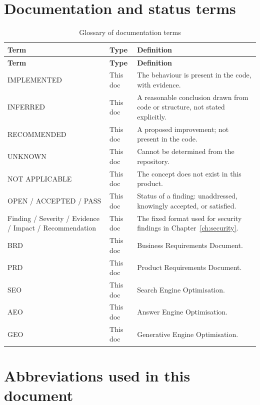 \section{Documentation and status terms}

\begin{longtable}{@{}L{3.8cm}L{1.6cm}L{8.8cm}@{}}
\caption{Glossary of documentation terms}\\
\toprule
\textbf{Term} & \textbf{Type} & \textbf{Definition} \\
\midrule
\endfirsthead
\toprule
\textbf{Term} & \textbf{Type} & \textbf{Definition} \\
\midrule
\endhead
IMPLEMENTED & This doc & The behaviour is present in the code, with evidence. \\
INFERRED & This doc & A reasonable conclusion drawn from code or structure, not
stated explicitly. \\
RECOMMENDED & This doc & A proposed improvement; not present in the code. \\
UNKNOWN & This doc & Cannot be determined from the repository. \\
NOT APPLICABLE & This doc & The concept does not exist in this product. \\
OPEN / ACCEPTED / PASS & This doc & Status of a finding: unaddressed, knowingly
accepted, or satisfied. \\
Finding / Severity / Evidence / Impact / Recommendation & This doc & The fixed
format used for security findings in Chapter~\ref{ch:security}. \\
BRD & This doc & Business Requirements Document. \\
PRD & This doc & Product Requirements Document. \\
SEO & This doc & Search Engine Optimisation. \\
AEO & This doc & Answer Engine Optimisation. \\
GEO & This doc & Generative Engine Optimisation. \\
\bottomrule
\end{longtable}

\section{Abbreviations used in this document}

